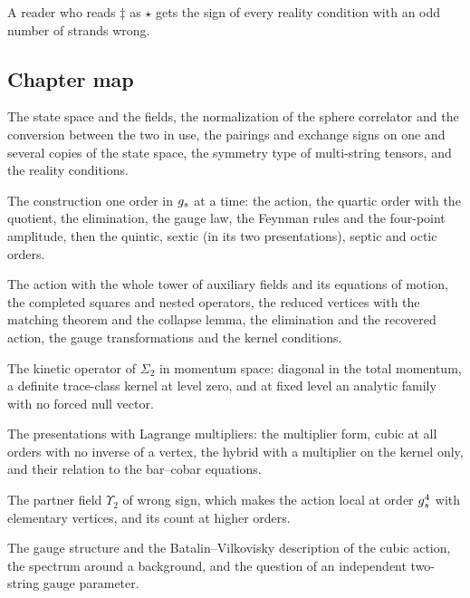 A reader who reads $\ddagger$ as $\star$ gets the sign of every reality condition with an odd number of strands wrong.

\subsection{Chapter map}
\label{sec:pre:map}

\begin{description}
  \setlength{\itemsep}{0.3ex}

  \item[\Cref{ch:conventions}] The state space and the fields, the normalization of the sphere correlator and the conversion between the two in use, the pairings and exchange signs on one and several copies of the state space, the symmetry type of multi-string tensors, and the reality conditions.

  \item[\Cref{ch:order-by-order}] The construction one order in $g_s$ at a time: the action, the quartic order with the quotient, the elimination, the gauge law, the Feynman rules and the four-point amplitude, then the quintic, sextic (in its two presentations), septic and octic orders.

  \item[\Cref{ch:all-orders}] The action with the whole tower of auxiliary fields and its equations of motion, the completed squares and nested operators, the reduced vertices with the matching theorem and the collapse lemma, the elimination and the recovered action, the gauge transformations and the kernel conditions.

  \item[\Cref{ch:momentum-space}] The kinetic operator of $\Sigma_2$ in momentum space: diagonal in the total momentum, a definite trace-class kernel at level zero, and at fixed level an analytic family with no forced null vector.

  \item[\Cref{ch:multiplier-hybrid}] The presentations with Lagrange multipliers: the multiplier form, cubic at all orders with no inverse of a vertex, the hybrid with a multiplier on the kernel only, and their relation to the bar--cobar equations.

  \item[\Cref{ch:partner-field}] The partner field $\Upsilon_2$ of wrong sign, which makes the action local at order $g_s^4$ with elementary vertices, and its count at higher orders.

  \item[\Cref{ch:gauge-bv}] The gauge structure and the Batalin--Vilkovisky description of the cubic action, the spectrum around a background, and the question of an independent two-string gauge parameter.


\end{description}
